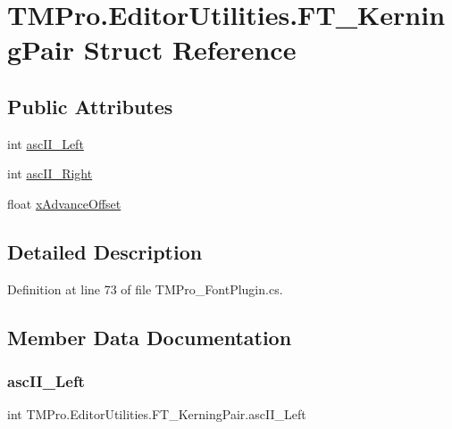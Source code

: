 \hypertarget{struct_t_m_pro_1_1_editor_utilities_1_1_f_t___kerning_pair}{}\section{T\+M\+Pro.\+Editor\+Utilities.\+F\+T\+\_\+\+Kerning\+Pair Struct Reference}
\label{struct_t_m_pro_1_1_editor_utilities_1_1_f_t___kerning_pair}
\subsection*{Public Attributes}
\begin{DoxyCompactItemize}
\item 
int \mbox{\hyperlink{struct_t_m_pro_1_1_editor_utilities_1_1_f_t___kerning_pair_ac33d2c0c9c52280a03dadc3090b58113}{asc\+I\+I\+\_\+\+Left}}
\item 
int \mbox{\hyperlink{struct_t_m_pro_1_1_editor_utilities_1_1_f_t___kerning_pair_a917af5004a15b2f456763cdb17555440}{asc\+I\+I\+\_\+\+Right}}
\item 
float \mbox{\hyperlink{struct_t_m_pro_1_1_editor_utilities_1_1_f_t___kerning_pair_ab863a45dc98811ed5f56920b44d44ec3}{x\+Advance\+Offset}}
\end{DoxyCompactItemize}


\subsection{Detailed Description}


Definition at line 73 of file T\+M\+Pro\+\_\+\+Font\+Plugin.\+cs.



\subsection{Member Data Documentation}
\mbox{\label{struct_t_m_pro_1_1_editor_utilities_1_1_f_t___kerning_pair_ac33d2c0c9c52280a03dadc3090b58113}} 
\subsubsection{\texorpdfstring{ascII\_Left}{ascII\_Left}}
{\footnotesize\ttfamily int T\+M\+Pro.\+Editor\+Utilities.\+F\+T\+\_\+\+Kerning\+Pair.\+asc\+I\+I\+\_\+\+Left}




